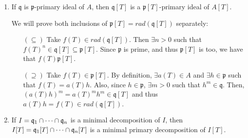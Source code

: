 \begin{problem}
\begin{enumerate}[label=(\theproblem.\arabic*),ref=\theproblem.\arabic*]
\begin{sol}
\begin{proof}
                Now, let $\mathfrak{p}$ be a minimal prime of $I$.
                $\mathfrak{p}[T]$ must contain a minimal prime of $I[T]$, say, $\mathfrak{p}'[T]$
                Then, we take the contraction $I \subseteq \mathfrak{p}' \subseteq \mathfrak{p}$
                and by definition of $\mathfrak{p}$ being a minimal of $I$,
                we conclude that $\mathfrak{p}' = \mathfrak{p}$ and $\mathfrak{p}'[T] = \mathfrak{p}[T]$.
                Thus, $\mathfrak{p}[T]$ is a minimal prime of $I[T]$.

            \end{proof}
        \end{sol}

        \item If $\mathfrak{q}$ is $\mathfrak{p}$-primary ideal of $A$, then $\mathfrak{q}[T]$ is a $\mathfrak{p}[T]$-primary ideal of $A[T]$.
        \begin{sol}
            We will prove both inclusions of $\mathfrak{p}[T] = rad(\mathfrak{q}[T])$ separately:
            \begin{itemize}
                \item[$(\subseteq)$]
                Take $f(T) \in rad(\mathfrak{q}[T])$.
                Then $\exists n>0$ such that $f(T)^n \in \mathfrak{q}[T] \subseteq \mathfrak{p}[T]$.
                Since $\mathfrak{p}$ is prime, and thus $\mathfrak{p}[T]$ is too, we have that $f(T) \mathfrak{p}[T]$.
                \item[$(\supseteq)$]
                Take $f(T) \in \mathfrak{p}[T]$.
                By definition, $\exists a(T) \in A$ and $\exists h \in \mathfrak{p}$ such that $f(T) = a(T) h$.
                Also, since $h \in \mathfrak{p}$, $\exists m>0$ such that $h^m \in \mathfrak{q}$.
                Then, $( a(T) h )^m = a(T)^m h^m \in \mathfrak{q}[T]$ and thus $a(T) h = f(T) \in rad(\mathfrak{q}[T])$.
            \end{itemize}
        \end{sol}

        \item If $I = \mathfrak{q}_1 \cap \cdots \cap \mathfrak{q}_n$ is a minimal decomposition of $I$, then $I[T] = \mathfrak{q}_1[T] \cap \cdots \cap \mathfrak{q}_n[T]$ is a minimal primary decomposition of $I[T]$.
        \begin{sol}
        \end{sol}

    \end{enumerate}
\end{problem}
